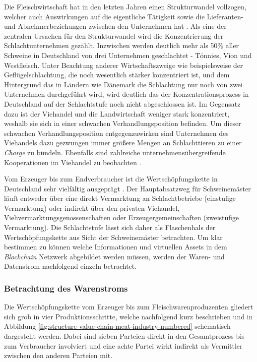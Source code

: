 Die Fleischwirtschaft hat in den letzten Jahren einen Strukturwandel vollzogen, welcher auch Auswirkungen auf die eigentliche Tätigkeit sowie die Lieferanten- und Abnehmerbeziehungen zwischen den Unternehmen hat \citep{Nolte2006}. Als eine der zentralen Ursachen für den Strukturwandel wird die Konzentrierung der Schlachtunternehmen gezählt. Inzwischen werden deutlich mehr als 50\% aller Schweine in Deutschland von drei Unternehmen geschlachtet - Tönnies, Vion und Westfleisch. Unter Beachtung anderer Wirtschaftszweige wie beispielsweise der Geflügelschlachtung, die noch wesentlich stärker konzentriert ist, und dem Hintergrund das in Ländern wie Dänemark die Schlachtung nur noch von zwei Unternehmen durchgeführt wird, wird deutlich das der Konzentrationsprozess in Deutschland auf der Schlachtstufe noch nicht abgeschlossen ist. Im Gegensatz dazu ist der Viehandel und die Landwirtschaft weniger stark konzentriert, weshalb sie sich in einer schwachen Verhandlungsposition befinden. Um dieser schwachen Verhandlungsposition entgegenzuwirken sind Unternehmen des Viehandels dazu gezwungen immer größere Mengen an Schlachttieren zu einer \textit{Charge} zu bündeln. Ebenfalls sind zahlreiche unternehmensübergreifende Kooperationen im Viehandel zu beobachten \citep{Voss2010}.

Vom Erzeuger bis zum Endverbraucher ist die Wertschöpfungskette in Deutschland sehr vielfältig ausgeprägt \citep{Freund1997}. Der Hauptabsatzweg für Schweinemäster läuft entweder über eine direkt Vermarktung an Schlachtbetriebe (einstufige Vermarktung) oder indirekt über den privaten Viehandel, Viehvermarktungsgenossenschaften oder Erzeugergemeinschaften (zweistufige Vermarktung). Die Schlachtstufe lässt sich daher als Flaschenhals der Wertschöpfungskette aus Sicht der Schweinemäster betrachten. Um klar bestimmen zu können welche Informationen und virtuellen Assets in dem \textit{Blockchain} Netzwerk abgebildet werden müssen, werden der Waren- und Datenstrom nachfolgend einzeln betrachtet.

\subsubsection{Betrachtung des Warenstroms}

Die Wertschöpfungskette vom Erzeuger bis zum Fleischwarenproduzenten gliedert sich grob in vier Produktionsschritte, welche nachfolgend kurz beschrieben und in Abbildung \ref{fig:structure-value-chain-meat-industry-numbered} schematisch dargestellt werden. Dabei sind sieben Parteien direkt in den Gesamtprozess bis zum Verbraucher involviert und eine achte Partei wirkt indirekt als Vermittler zwischen den anderen Parteien mit.

